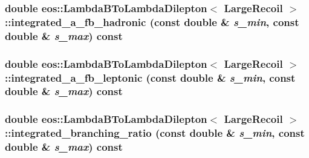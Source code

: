 \label{classeos_1_1LambdaBToLambdaDilepton_3_01LargeRecoil_01_4_a2f3dff9b5c595702373e069fff4ff718}
\hypertarget{classeos_1_1LambdaBToLambdaDilepton_3_01LargeRecoil_01_4_a9f26950464c21533e4620d70d25473b6}{
\subsubsection[{integrated\_\-a\_\-fb\_\-hadronic}]{\setlength{\rightskip}{0pt plus 5cm}double eos::LambdaBToLambdaDilepton$<$ {\bf LargeRecoil} $>$::integrated\_\-a\_\-fb\_\-hadronic (const double \& {\em s\_\-min}, \/  const double \& {\em s\_\-max}) const}}
\label{classeos_1_1LambdaBToLambdaDilepton_3_01LargeRecoil_01_4_a9f26950464c21533e4620d70d25473b6}
\hypertarget{classeos_1_1LambdaBToLambdaDilepton_3_01LargeRecoil_01_4_a2b2ddd2fb25343fdecd5e782bb5bda82}{
\subsubsection[{integrated\_\-a\_\-fb\_\-leptonic}]{\setlength{\rightskip}{0pt plus 5cm}double eos::LambdaBToLambdaDilepton$<$ {\bf LargeRecoil} $>$::integrated\_\-a\_\-fb\_\-leptonic (const double \& {\em s\_\-min}, \/  const double \& {\em s\_\-max}) const}}
\label{classeos_1_1LambdaBToLambdaDilepton_3_01LargeRecoil_01_4_a2b2ddd2fb25343fdecd5e782bb5bda82}
\hypertarget{classeos_1_1LambdaBToLambdaDilepton_3_01LargeRecoil_01_4_a83fa63546f5fc4c9e49ea542fa2ca903}{
\subsubsection[{integrated\_\-branching\_\-ratio}]{\setlength{\rightskip}{0pt plus 5cm}double eos::LambdaBToLambdaDilepton$<$ {\bf LargeRecoil} $>$::integrated\_\-branching\_\-ratio (const double \& {\em s\_\-min}, \/  const double \& {\em s\_\-max}) const}}
